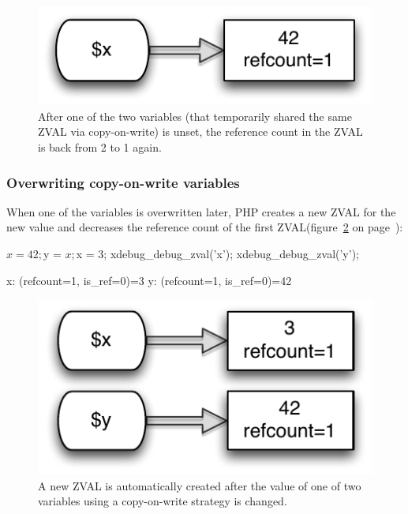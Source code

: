 \begin{figure}[!h]
  \begin{center}
    \includegraphics[scale=0.8]{images/x_42}
    \caption{After one of the two variables (that temporarily shared the same ZVAL via copy-on-write) is unset, the reference count in the ZVAL is back from 2 to 1 again.}
    \label{fig:reference-count-decreased}
  \end{center}
\end{figure}


\subsubsection{Overwriting copy-on-write variables}
\label{sec:overwriting}

When one of the variables is overwritten later, PHP creates a new ZVAL for the new value and decreases the reference count of the first ZVAL(figure~\ref{fig:new-zval-after-copy-on-write} on page~\pageref{fig:new-zval-after-copy-on-write}):

\begin{phpcode}
$x = 42;
$y = $x;
$x = 3;
xdebug_debug_zval('x');
xdebug_debug_zval('y');
\end{phpcode}

\begin{textcode}
x: (refcount=1, is_ref=0)=3
y: (refcount=1, is_ref=0)=42
\end{textcode}

\begin{figure}[!h]
  \begin{center}
    \includegraphics[scale=0.8]{images/x_3_y_42}
    \caption{A new ZVAL is automatically created after the value of one of two variables using a copy-on-write strategy is changed.}
    \label{fig:new-zval-after-copy-on-write}
  \end{center}
\end{figure}

